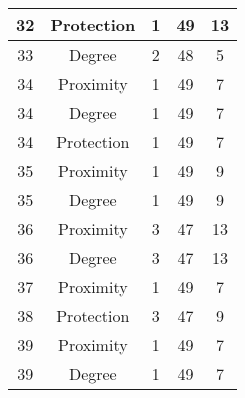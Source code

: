 \documentclass[results.tex]{subfiles}
\begin{document}
\begin{center}
\begin{tabular}{| c || c | c | c | c |}
            \hline
            32                      & Protection                   & 1                      & 49                      & 13                   \\
            \hline
            33                      & Degree                       & 2                      & 48                      & 5                    \\
            \hline
            34                      & Proximity                    & 1                      & 49                      & 7                    \\
            \hline
            34                      & Degree                       & 1                      & 49                      & 7                    \\
            \hline
            34                      & Protection                   & 1                      & 49                      & 7                    \\
            \hline
            35                      & Proximity                    & 1                      & 49                      & 9                    \\
            \hline
            35                      & Degree                       & 1                      & 49                      & 9                    \\
            \hline
            36                      & Proximity                    & 3                      & 47                      & 13                   \\
            \hline
            36                      & Degree                       & 3                      & 47                      & 13                   \\
            \hline
            37                      & Proximity                    & 1                      & 49                      & 7                    \\
            \hline
            38                      & Protection                   & 3                      & 47                      & 9                    \\
            \hline
            39                      & Proximity                    & 1                      & 49                      & 7                    \\
            \hline
            39                      & Degree                       & 1                      & 49                      & 7                    \\

\end{tabular}
\end{center}
\end{document}
